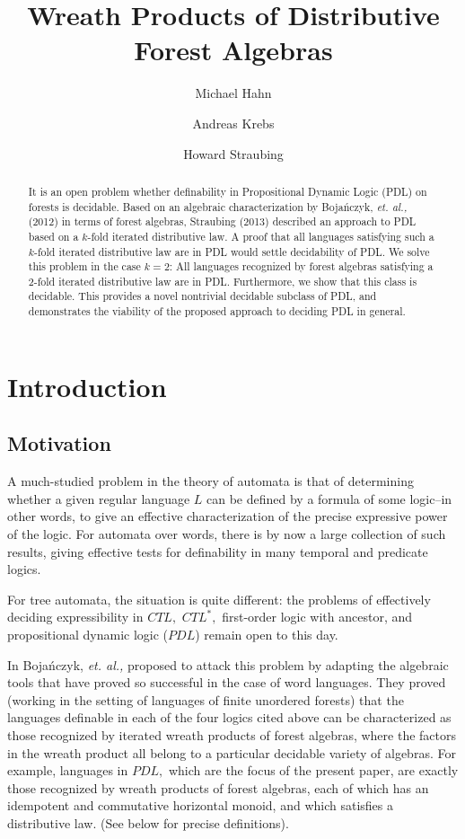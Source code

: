 \documentclass[sigplan,9pt]{acmart}\settopmatter{printfolios=true,printccs=false,printacmref=false}
\title{Wreath Products of Distributive Forest Algebras}
\author{Michael Hahn}
\affiliation{%
  \institution{Stanford University}
}
\author{Andreas Krebs}
\affiliation{%
  \institution{University of T{\"u}bingen}
}
\author{Howard Straubing}
\affiliation{%
  \institution{Boston College}
}
\theoremstyle{definition}
\begin{document}
\begin{abstract}

It is an open problem whether definability in Propositional Dynamic Logic (PDL) on forests is decidable.
Based on an algebraic characterization by Boja{\'n}czyk, {\it et. al.,} (2012) in terms of forest algebras, Straubing (2013) described an approach to PDL based on a $k$-fold iterated distributive law.
A proof that all languages satisfying such a $k$-fold iterated distributive law are in PDL would  settle decidability of PDL.
We solve this problem in the case $k = 2$: All languages recognized by forest algebras satisfying a 2-fold iterated distributive law are in PDL.
Furthermore, we show that this class is decidable.
This provides a novel nontrivial decidable subclass of PDL, and demonstrates the viability of the proposed approach to deciding PDL in general.
\end{abstract}

\maketitle


\section{Introduction}

\subsection{Motivation}

A much-studied problem in the theory of automata is that of determining whether a given regular language $L$ can be defined by a formula of some logic--in other words, to give an effective characterization of the precise expressive power of the logic.  For automata over words, there is by now a large collection of such results, giving effective tests for definability in many temporal and predicate logics. 

For tree automata, the situation is quite different: the problems of effectively deciding expressibility in $CTL,$ $CTL^*,$ first-order logic with ancestor, and propositional dynamic logic ($PDL$) remain open to this day.

In  \cite{bojanczyk-wreath-2012} Boja{\'n}czyk, {\it et. al.,} proposed to attack this problem by adapting the algebraic tools that have proved so successful in the case of word languages.  They proved (working in the setting of languages of finite unordered forests) that the languages definable in each of the four logics cited above can be characterized as those recognized by iterated wreath products of forest algebras, where the factors in the wreath product all belong to a particular decidable variety of algebras.  For example, languages in $PDL,$   which are the focus of the present paper, are exactly those recognized by wreath products of forest algebras, each of which has an idempotent and commutative horizontal monoid, and which satisfies a distributive law.  (See below for precise definitions).
\end{document}
